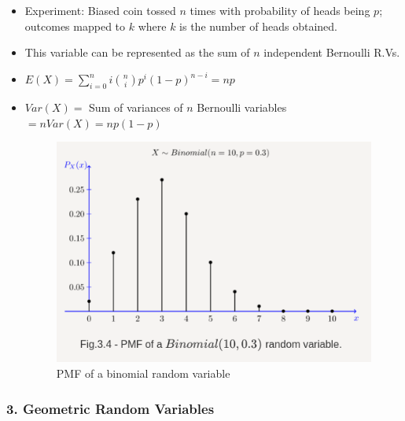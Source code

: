 \begin{itemize}
\item
  Experiment: Biased coin tossed \(n\) times with probability of heads
  being \(p\); outcomes mapped to \(k\) where \(k\) is the number of
  heads obtained.
\item
  This variable can be represented as the sum of \(n\) independent
  Bernoulli R.Vs.
\item
  \(E(X) = \displaystyle\sum_{i=0}^{n}i{n \choose i}p^i(1-p)^{n-i} = np\)
\item
  \(Var(X) =\) Sum of variances of \(n\) Bernoulli variables
  \(=nVar(X) = np(1-p)\)

  \begin{figure}
  \centering
  \includegraphics{Lecture 13 Notes e842fef9a3e0449fa78bac59b75dbc5c/Screenshot_from_2021-08-06_23-12-57.png}
  \caption{PMF of a binomial random variable}
  \end{figure}
\end{itemize}

\hypertarget{geometric-random-variables}{%
\subsubsection{3. Geometric Random
Variables}\label{geometric-random-variables}}

